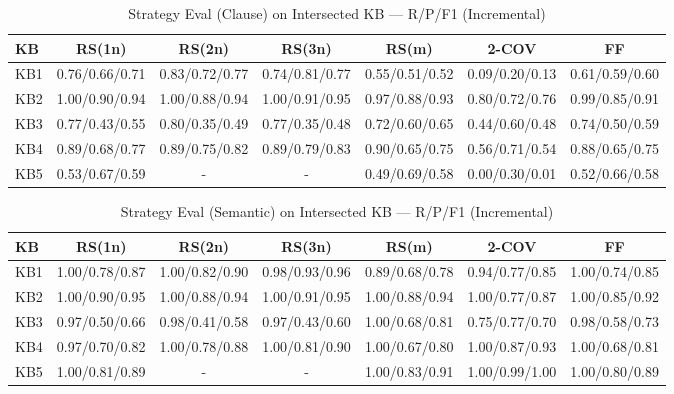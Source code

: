 \begin{table}[htbp]
\centering
\caption{Strategy Eval (Clause) on Intersected KB — R/P/F1 (Incremental)}
\label{tab:eval_clause_incremental}
\begin{tabular}{lcccccc}
\toprule
KB & RS(1n) & RS(2n) & RS(3n) & RS(m) & 2-COV & FF \\
\midrule
KB1 & 0.76/0.66/0.71 & 0.83/0.72/0.77 & 0.74/0.81/0.77 & 0.55/0.51/0.52 & 0.09/0.20/0.13 & 0.61/0.59/0.60 \\
KB2 & 1.00/0.90/0.94 & 1.00/0.88/0.94 & 1.00/0.91/0.95 & 0.97/0.88/0.93 & 0.80/0.72/0.76 & 0.99/0.85/0.91 \\
KB3 & 0.77/0.43/0.55 & 0.80/0.35/0.49 & 0.77/0.35/0.48 & 0.72/0.60/0.65 & 0.44/0.60/0.48 & 0.74/0.50/0.59 \\
KB4 & 0.89/0.68/0.77 & 0.89/0.75/0.82 & 0.89/0.79/0.83 & 0.90/0.65/0.75 & 0.56/0.71/0.54 & 0.88/0.65/0.75 \\
KB5 & 0.53/0.67/0.59 & - & - & 0.49/0.69/0.58 & 0.00/0.30/0.01 & 0.52/0.66/0.58 \\
\bottomrule
\end{tabular}
\end{table}

\begin{table}[htbp]
\centering
\caption{Strategy Eval (Semantic) on Intersected KB — R/P/F1 (Incremental)}
\label{tab:eval_semantic_incremental}
\begin{tabular}{lcccccc}
\toprule
KB & RS(1n) & RS(2n) & RS(3n) & RS(m) & 2-COV & FF \\
\midrule
KB1 & 1.00/0.78/0.87 & 1.00/0.82/0.90 & 0.98/0.93/0.96 & 0.89/0.68/0.78 & 0.94/0.77/0.85 & 1.00/0.74/0.85 \\
KB2 & 1.00/0.90/0.95 & 1.00/0.88/0.94 & 1.00/0.91/0.95 & 1.00/0.88/0.94 & 1.00/0.77/0.87 & 1.00/0.85/0.92 \\
KB3 & 0.97/0.50/0.66 & 0.98/0.41/0.58 & 0.97/0.43/0.60 & 1.00/0.68/0.81 & 0.75/0.77/0.70 & 0.98/0.58/0.73 \\
KB4 & 0.97/0.70/0.82 & 1.00/0.78/0.88 & 1.00/0.81/0.90 & 1.00/0.67/0.80 & 1.00/0.87/0.93 & 1.00/0.68/0.81 \\
KB5 & 1.00/0.81/0.89 & - & - & 1.00/0.83/0.91 & 1.00/0.99/1.00 & 1.00/0.80/0.89 \\
\bottomrule
\end{tabular}
\end{table}

